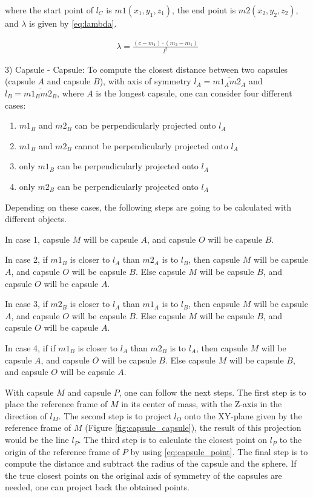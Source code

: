 \documentclass[a4paper, 10pt, conference]{ieeeconf}      %
\begin{document}
where the start point of $l_C$ is $m1(x_1, y_1, z_1)$, the end point is $m2(x_2, y_2, z_2)$, and $\lambda$ is given by \eqref{eq:lambda}.

\begin{equation}       
    \begin{matrix} 
        \lambda = \frac{(c - m_1) \cdot (m_2 - m_1 )}{l^2} \label{eq:lambda}
    \end{matrix}
\end{equation}

3) Capsule - Capsule:
To compute the closest distance between two capsules (capsule $A$ and capsule $B$), with axis of symmetry $l_A = \overline{m1_A m2_A}$ and $l_B = \overline{m1_B m2_B}$, 
where $A$ is the longest capsule, one can consider four different cases:
\begin{enumerate}
    \item $m1_B$ and $m2_B$ can be perpendicularly projected onto $l_A$
    \item $m1_B$ and $m2_B$ cannot be perpendicularly projected onto $l_A$
    \item only $m1_B$ can be perpendicularly projected onto $l_A$
    \item only $m2_B$ can be perpendicularly projected onto $l_A$
\end{enumerate} 

Depending on these cases, the following steps are going to be calculated with different objects.

In case 1, capsule $M$ will be capsule $A$, and capsule $O$ will be capsule $B$.

In case 2, if $m1_B$ is closer to $l_A$ than $m2_A$ is to $l_B$, then capsule $M$ will be capsule $A$, and capsule $O$ will be capsule $B$.
Else capsule $M$ will be capsule $B$, and capsule $O$ will be capsule $A$.

In case 3, if $m2_B$ is closer to $l_A$ than $m1_A$ is to $l_B$, then capsule $M$ will be capsule $A$, and capsule $O$ will be capsule $B$.
Else capsule $M$ will be capsule $B$, and capsule $O$ will be capsule $A$.

In case 4, if if $m1_B$ is closer to $l_A$ than $m2_B$ is to $l_A$, then capsule $M$ will be capsule $A$, and capsule $O$ will be capsule $B$.
Else capsule $M$ will be capsule $B$, and capsule $O$ will be capsule $A$.

With capsule $M$ and capsule $P$, one can follow the next steps.
The first step is to place the reference frame of $M$ in its center of mass, with the Z-axis in the direction of $l_M$. 
The second step is to project $l_O$ onto the XY-plane given by the reference frame of $M$ (Figure \ref{fig:capsule_capsule}),
the result of this projection would be the line $l_P$.
The third step is to calculate the closest point on $l_P$ to the origin of the reference frame of $P$ by using \eqref{eq:capsule_point}. 
The final step is to compute the distance and subtract the radius of the capsule and the sphere.
If the true closest points on the original axis of symmetry of the capsules are needed, one can project back the obtained points.
\end{document}
